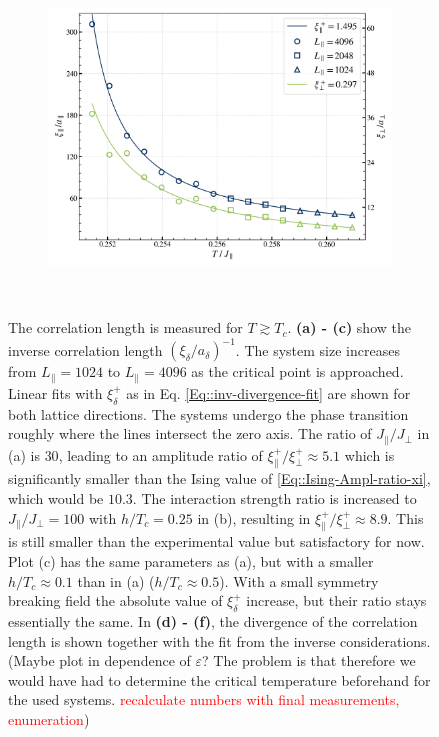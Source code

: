 \begin{figure}[htp]
\begin{subfigure}{0.475\textwidth}
		\end{subfigure}
		\begin{subfigure}{0.475\textwidth}
			\centering
			\includegraphics[width=0.95\linewidth]{graphics/xi-divergence-small-h-4.png}
		\end{subfigure} \\ \par\bigskip
		\caption{The correlation length is measured for $T \gtrsim T_c$. \textbf{(a) - (c)}  show the inverse correlation length $(\xi_\delta /	a_\delta)^{-1}$. The system size increases from $L_\parallel =	1024$ to $L_\parallel =	4096$ as the critical point is approached. Linear fits with $\xi_\delta^+$ as in Eq. \eqref{Eq::inv-divergence-fit} are shown for both lattice directions. The systems undergo the phase transition roughly where the lines intersect the zero axis. The ratio of $ J_\parallel /	J_\perp$ in (a) is $30$, leading to an amplitude ratio of $\xi_{\parallel}^+ /	\xi_\perp^+  \approx  5.1$ which is significantly smaller than the Ising value of \eqref{Eq::Ising-Ampl-ratio-xi}, which would be $10.3$. The interaction strength ratio is increased to $ J_\parallel /	J_\perp =	100$ with $h /	T_c =	0.25$ in (b), resulting in  $\xi_{\parallel}^+ /	\xi_\perp^+  \approx  8.9$. This is still smaller than the experimental value but satisfactory for now. Plot (c) has the same parameters as (a), but with a smaller $h / T_c  \approx 0.1$ than in (a) ($h /	T_c \approx 0.5$). With a small symmetry breaking field the absolute value of $\xi_\delta^+$ increase, but their ratio stays essentially the same. In \textbf{(d) - (f)}, the divergence of the correlation length is shown together with the fit from the inverse considerations. (Maybe plot in dependence of $\varepsilon$? The problem is that therefore we would have had to determine the critical temperature beforehand for the used systems. \textcolor{red}{recalculate numbers with final measurements, enumeration})}
		\label{Fig::Amplitude-Result}
	\end{figure}	
